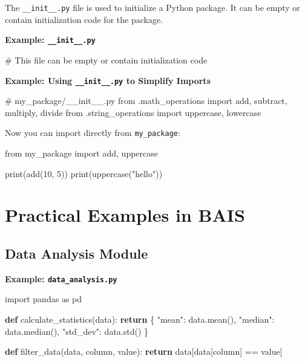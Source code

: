 \documentclass[
  letterpaper,
  DIV=11,
  numbers=noendperiod]{scrreprt}
\newenvironment{Shaded}{\begin{snugshade}}{\end{snugshade}}
\newcommand{\BuiltInTok}[1]{\textcolor[rgb]{0.00,0.23,0.31}{#1}}
\newcommand{\CommentTok}[1]{\textcolor[rgb]{0.37,0.37,0.37}{#1}}
\newcommand{\ControlFlowTok}[1]{\textcolor[rgb]{0.00,0.23,0.31}{\textbf{#1}}}
\newcommand{\DecValTok}[1]{\textcolor[rgb]{0.68,0.00,0.00}{#1}}
\newcommand{\ImportTok}[1]{\textcolor[rgb]{0.00,0.46,0.62}{#1}}
\newcommand{\KeywordTok}[1]{\textcolor[rgb]{0.00,0.23,0.31}{\textbf{#1}}}
\newcommand{\NormalTok}[1]{\textcolor[rgb]{0.00,0.23,0.31}{#1}}
\newcommand{\OperatorTok}[1]{\textcolor[rgb]{0.37,0.37,0.37}{#1}}
\newcommand{\StringTok}[1]{\textcolor[rgb]{0.13,0.47,0.30}{#1}}
\begin{document}
The \texttt{\_\_init\_\_.py} file is used to initialize a Python
package. It can be empty or contain initialization code for the package.

\textbf{Example: \texttt{\_\_init\_\_.py}}

\begin{Shaded}
\begin{Highlighting}[]
\CommentTok{\# This file can be empty or contain initialization code}
\end{Highlighting}
\end{Shaded}

\textbf{Example: Using \texttt{\_\_init\_\_.py} to Simplify Imports}

\begin{Shaded}
\begin{Highlighting}[]
\CommentTok{\# my\_package/\_\_init\_\_.py}
\ImportTok{from}\NormalTok{ .math\_operations }\ImportTok{import}\NormalTok{ add, subtract, multiply, divide}
\ImportTok{from}\NormalTok{ .string\_operations }\ImportTok{import}\NormalTok{ uppercase, lowercase}
\end{Highlighting}
\end{Shaded}

Now you can import directly from \texttt{my\_package}:

\begin{Shaded}
\begin{Highlighting}[]
\ImportTok{from}\NormalTok{ my\_package }\ImportTok{import}\NormalTok{ add, uppercase}

\BuiltInTok{print}\NormalTok{(add(}\DecValTok{10}\NormalTok{, }\DecValTok{5}\NormalTok{))}
\BuiltInTok{print}\NormalTok{(uppercase(}\StringTok{"hello"}\NormalTok{))}
\end{Highlighting}
\end{Shaded}

\section{Practical Examples in BAIS}\label{practical-examples-in-bais-1}

\subsection{Data Analysis Module}\label{data-analysis-module}

\textbf{Example: \texttt{data\_analysis.py}}

\begin{Shaded}
\begin{Highlighting}[]
\ImportTok{import}\NormalTok{ pandas }\ImportTok{as}\NormalTok{ pd}

\KeywordTok{def}\NormalTok{ calculate\_statistics(data):}
    \ControlFlowTok{return}\NormalTok{ \{}
        \StringTok{"mean"}\NormalTok{: data.mean(),}
        \StringTok{"median"}\NormalTok{: data.median(),}
        \StringTok{"std\_dev"}\NormalTok{: data.std()}
\NormalTok{    \}}

\KeywordTok{def}\NormalTok{ filter\_data(data, column, value):}
    \ControlFlowTok{return}\NormalTok{ data[data[column] }\OperatorTok{==}\NormalTok{ value]}
\end{Highlighting}
\end{Shaded}
\end{document}
